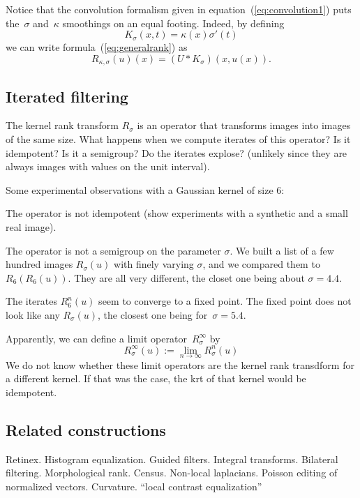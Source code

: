 \documentclass[12pt]{article}                  %
\begin{document}
Notice that the convolution formalism given in
equation~(\ref{eq:convolution1}) puts the~$\sigma$ and~$\kappa$ smoothings
on an equal footing.  Indeed, by defining
\[
	K_\sigma(x,t)=\kappa(x)\sigma'(t)
\]
we can write formula~(\ref{eq:generalrank}) as
\begin{equation}\label{eq:convolution2}
	R_{\kappa,\sigma}(u)(x)=(U*K_\sigma)(x,u(x)).
\end{equation}

\subsection{Iterated filtering}

The kernel rank transform $R_\sigma$ is an operator that transforms images into images of the same size.
What happens when we compute iterates of this operator?   Is it idempotent?  Is it a semigroup?  Do the iterates explose? (unlikely since they are always images with values on the unit interval).

Some experimental observations with a Gaussian kernel of size
6:

The operator is not idempotent (show experiments with a synthetic and a small real image).

The operator is not a semigroup on the parameter $\sigma$.  We built a list of a few hundred images $R_\sigma(u)$ with finely varying $\sigma$, and we compared them to $R_6(R_6(u))$.  They are all very different, the closet one being about $\sigma=4.4$.

The iterates $R_6^n(u)$ seem to converge to a fixed point.  The fixed point does not look like any $R_\sigma(u)$, the closest one being for~$\sigma=5.4$.

Apparently, we can define a limit operator~$R^\infty_\sigma$ by
\[
R^\infty_\sigma(u) := \lim_{n\to\infty}R^n_\sigma(u)
\]
We do not know whether these limit operators are the kernel rank transdform for a different kernel.   If that was the case, the krt of that kernel  would be idempotent.   

\subsection{Related constructions}

Retinex.  Histogram equalization.  Guided filters.  Integral transforms.
Bilateral filtering.
Morphological rank.  Census.  Non-local laplacians.  Poisson editing of
normalized vectors.  Curvature. ``local contrast equalization''
\end{document}

